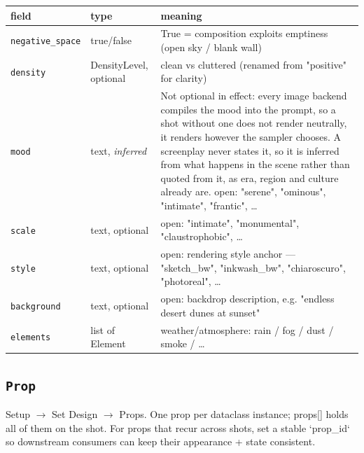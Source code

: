 \begin{longtable}{@{}R{0.24\textwidth}R{0.21\textwidth}R{0.49\textwidth}@{}}
\toprule \textbf{field} & \textbf{type} & \textbf{meaning} \\ \midrule
\endhead
\texttt{negative\_\allowbreak space} & true/\allowbreak{}false & True = composition exploits emptiness (open sky /\allowbreak{} blank wall) \\
\texttt{density} & DensityLevel, optional & clean vs cluttered (renamed from "positive" for clarity) \\
\texttt{mood} & text, \emph{inferred} & Not optional in effect: every image backend compiles the mood into the prompt, so a shot without one does not render neutrally, it renders however the sampler chooses. A screenplay never states it, so it is inferred from what happens in the scene rather than quoted from it, as era, region and culture already are. open: "serene", "ominous", "intimate", "frantic", \ldots{} \\
\texttt{scale} & text, optional & open: "intimate", "monumental", "claustrophobic", \ldots{} \\
\texttt{style} & text, optional & open: rendering style anchor ---\allowbreak{} "sketch\_\allowbreak bw", "inkwash\_\allowbreak bw", "chiaroscuro", "photoreal", \ldots{} \\
\texttt{background} & text, optional & open: backdrop description, e.g. "endless desert dunes at sunset" \\
\texttt{elements} & list of Element & weather/\allowbreak{}atmosphere: rain /\allowbreak{} fog /\allowbreak{} dust /\allowbreak{} smoke /\allowbreak{} \ldots{} \\
\bottomrule
\end{longtable}

\subsection*{\texttt{Prop}}
\noindent Setup $\to$ Set Design $\to$ Props. One prop per dataclass instance; props[] holds all of them on the shot. For props that recur across shots, set a stable `prop\_\allowbreak id` so downstream consumers can keep their appearance + state consistent.

